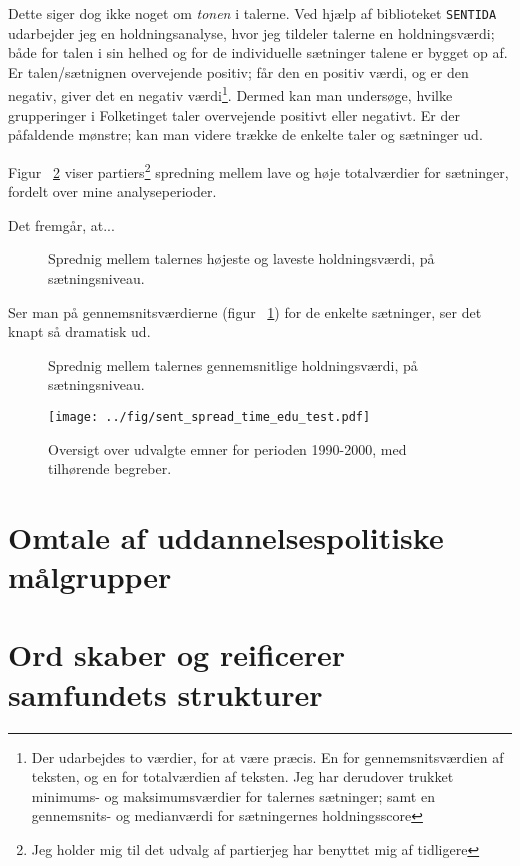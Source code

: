 Dette siger dog ikke noget om \textit{tonen} i talerne.
Ved hjælp af biblioteket \texttt{SENTIDA} udarbejder jeg en holdningsanalyse, hvor jeg tildeler talerne en holdningsværdi; både for talen i sin helhed og for de individuelle sætninger talene er bygget op af.
Er talen/sætnignen overvejende positiv; får den en positiv værdi, og er den negativ, giver det en negativ værdi\footnote{Der udarbejdes to værdier, for at være præcis. En for gennemsnitsværdien af teksten, og en for totalværdien af teksten. Jeg har derudover trukket minimums- og maksimumsværdier for talernes sætninger; samt en gennemsnits- og medianværdi for sætningernes holdningsscore}.
Dermed kan man undersøge, hvilke grupperinger i Folketinget taler overvejende positivt eller negativt.
Er der påfaldende mønstre; kan man videre trække de enkelte taler og sætninger ud.

Figur ~\ref{fig:sentposneg} viser partiers\footnote{Jeg holder mig til det udvalg af partierjeg har benyttet mig af tidligere} spredning mellem lave og høje totalværdier for sætninger, fordelt over mine analyseperioder.

Det fremgår, at...

\begin{figure}
  
\caption{Sprednig mellem talernes højeste og laveste holdningsværdi, på sætningsniveau.}
\label{fig:sentminmax}
\end{figure}

Ser man på gennemsnitsværdierne (figur ~\ref{fig:sentminmax})  for de enkelte sætninger, ser det knapt så dramatisk ud.

\begin{figure}
  
\caption{Sprednig mellem talernes gennemsnitlige holdningsværdi, på sætningsniveau.}
\label{fig:sentposneg}
\end{figure}

\begin{figure}
\begin{adjustwidth}{-1.6in}{-1.5in}
  \texttt{[image: ../fig/sent\_spread\_time\_edu\_test.pdf]}
\end{adjustwidth}
\caption{Oversigt over udvalgte emner for perioden 1990-2000, med tilhørende begreber.}
\label{fig:sentspread}
\end{figure}


\section{Omtale af uddannelsespolitiske målgrupper}

\section{Ord skaber og reificerer samfundets strukturer}

